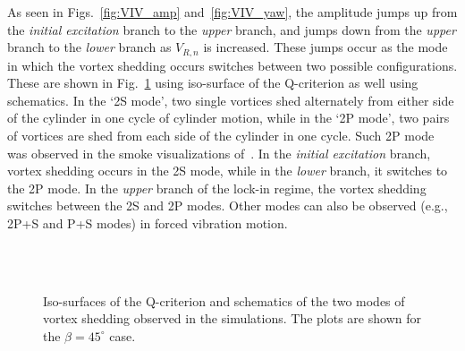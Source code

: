 As seen in Figs.~\ref{fig:VIV_amp} and~\ref{fig:VIV_yaw}, the amplitude jumps
up from the {\em initial excitation} branch to the {\em upper} branch, and
jumps down from the {\em upper} branch to the {\em lower} branch as $V_{R,n}$
is increased. These jumps occur as the mode in which the vortex shedding occurs
switches between two possible configurations. These are shown in
Fig.~\ref{fig:VIV_Q} using iso-surface of the Q-criterion as well using
schematics. In the `2S mode', two single vortices shed alternately from either
side of the cylinder in one cycle of cylinder motion, while in the `2P mode',
two pairs of vortices are shed from each side of the cylinder in one cycle.
Such 2P mode was observed in the smoke visualizations
of~\cite{brika1993vortex}. In the {\em initial excitation} branch, vortex
shedding occurs in the 2S mode, while in the {\em lower} branch, it switches to
the 2P mode.  In the {\em upper} branch of the lock-in regime, the vortex
shedding switches between the 2S and 2P modes. Other modes can also be observed
(e.g., 2P+S and P+S modes) in forced vibration motion.
%
\begin{figure}[htb!]
   \qquad
   \\
%
   \qquad
   \\
    \caption{Iso-surfaces of the Q-criterion and schematics of the two modes of
      vortex shedding observed in the simulations. The plots are shown for the
      $\beta=45^\circ$ case.}
  \label{fig:VIV_Q}
\end{figure}
%
